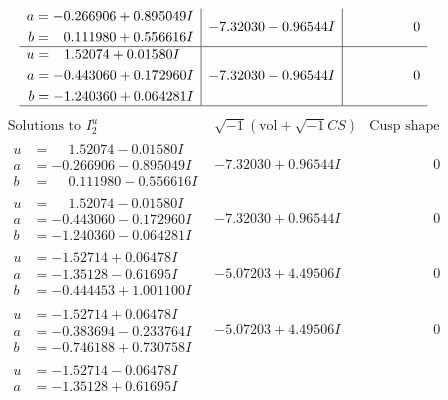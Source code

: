 \documentclass[1p]{elsarticle_modified}
\theoremstyle{definition}
\newcommand{\I}{\sqrt{-1}}
\begin{document}
$$\begin{array}{c|c|c}
\begin{aligned}
a &= -0.266906 + 0.895049 I \\
b &= \phantom{-}0.111980 + 0.556616 I\end{aligned}
 & -7.32030 - 0.96544 I & \phantom{-0.000000 } 0 \\ \hline\begin{aligned}
u &= \phantom{-}1.52074 + 0.01580 I \\
a &= -0.443060 + 0.172960 I \\
b &= -1.240360 + 0.064281 I\end{aligned}
 & -7.32030 - 0.96544 I & \phantom{-0.000000 } 0\\
 \hline 
 \end{array}$$\newpage$$\begin{array}{c|c|c}  
\text{Solutions to }I^u_{2}& \I (\text{vol} + \sqrt{-1}CS) & \text{Cusp shape}\\
 \hline 
\begin{aligned}
u &= \phantom{-}1.52074 - 0.01580 I \\
a &= -0.266906 - 0.895049 I \\
b &= \phantom{-}0.111980 - 0.556616 I\end{aligned}
 & -7.32030 + 0.96544 I & \phantom{-0.000000 } 0 \\ \hline\begin{aligned}
u &= \phantom{-}1.52074 - 0.01580 I \\
a &= -0.443060 - 0.172960 I \\
b &= -1.240360 - 0.064281 I\end{aligned}
 & -7.32030 + 0.96544 I & \phantom{-0.000000 } 0 \\ \hline\begin{aligned}
u &= -1.52714 + 0.06478 I \\
a &= -1.35128 - 0.61695 I \\
b &= -0.444453 + 1.001100 I\end{aligned}
 & -5.07203 + 4.49506 I & \phantom{-0.000000 } 0 \\ \hline\begin{aligned}
u &= -1.52714 + 0.06478 I \\
a &= -0.383694 - 0.233764 I \\
b &= -0.746188 + 0.730758 I\end{aligned}
 & -5.07203 + 4.49506 I & \phantom{-0.000000 } 0 \\ \hline\begin{aligned}
u &= -1.52714 - 0.06478 I \\
a &= -1.35128 + 0.61695 I \\

\end{aligned}
\end{array}$$
\end{document}
